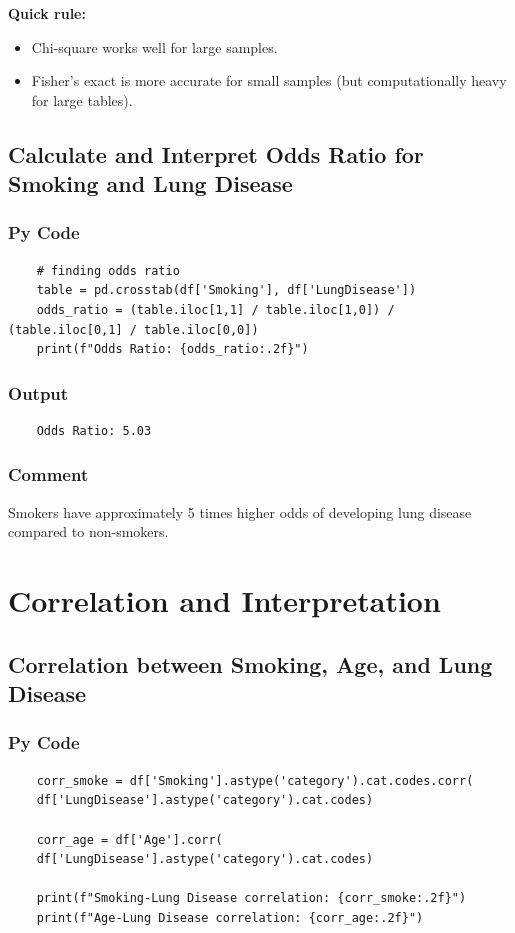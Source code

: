 \documentclass[a4paper,12pt]{article}
\begin{document}
\textbf{Quick rule:}
\begin{itemize}
	\item Chi-square works well for large samples.
	\item Fisher's exact is more accurate for small samples (but computationally heavy for large tables).
\end{itemize}


\subsection{Calculate and Interpret Odds Ratio for Smoking and Lung Disease}

\subsubsection{Py Code}
\begin{lstlisting}
	# finding odds ratio
	table = pd.crosstab(df['Smoking'], df['LungDisease'])
	odds_ratio = (table.iloc[1,1] / table.iloc[1,0]) / (table.iloc[0,1] / table.iloc[0,0])
	print(f"Odds Ratio: {odds_ratio:.2f}")
\end{lstlisting}

\subsubsection{Output}
\begin{verbatim}
	Odds Ratio: 5.03
\end{verbatim}

\subsubsection{Comment}
Smokers have approximately 5 times higher odds of developing lung disease compared to non-smokers.
\section{Correlation and Interpretation}

\subsection{Correlation between Smoking, Age, and Lung Disease}

\subsubsection{Py Code}
\begin{lstlisting}
	corr_smoke = df['Smoking'].astype('category').cat.codes.corr(
	df['LungDisease'].astype('category').cat.codes)
	
	corr_age = df['Age'].corr(
	df['LungDisease'].astype('category').cat.codes)
	
	print(f"Smoking-Lung Disease correlation: {corr_smoke:.2f}")
	print(f"Age-Lung Disease correlation: {corr_age:.2f}")
\end{lstlisting}
\end{document}
